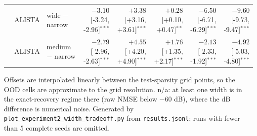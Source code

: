 \begin{table}[htbp]
\begin{tabular}{@{} l l l r rr rr @{}}
 & ALISTA & wide $-$ narrow & $-3.10$ [-3.24, -2.96]$^{***}$ & $+3.38$ [+3.16, +3.61]$^{***}$ & $+0.28$ [+0.10, +0.47]$^{**}$ & $-6.50$ [-6.71, -6.29]$^{***}$ & $-9.60$ [-9.73, -9.47]$^{***}$ \\
 & ALISTA & medium $-$ narrow & $-2.79$ [-2.96, -2.63]$^{***}$ & $+4.55$ [+4.20, +4.90]$^{***}$ & $+1.76$ [+1.35, +2.17]$^{***}$ & $-2.13$ [-2.33, -1.92]$^{***}$ & $-4.92$ [-5.03, -4.80]$^{***}$ \\
\bottomrule
\end{tabular}
\vspace{2pt}
\begin{minipage}{\linewidth}\footnotesize
Offsets are interpolated linearly between the test-sparsity grid points, so the OOD cells are approximate to the grid resolution. n/a: at least one width is in the exact-recovery regime there (raw NMSE below $-60$ dB), where the dB difference is numerical noise. Generated by \texttt{plot\_experiment2\_width\_tradeoff.py} from \texttt{results.jsonl}; runs with fewer than 5 complete seeds are omitted.
\end{minipage}
\end{table}
